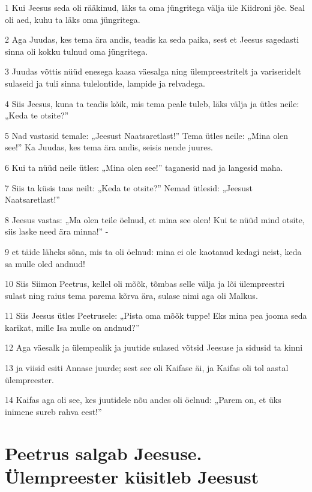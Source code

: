 \par 1 Kui Jeesus seda oli rääkinud, läks ta oma jüngritega välja üle Kiidroni jõe. Seal oli aed, kuhu ta läks oma jüngritega.
\par 2 Aga Juudas, kes tema ära andis, teadis ka seda paika, sest et Jeesus sagedasti sinna oli kokku tulnud oma jüngritega.
\par 3 Juudas võttis nüüd enesega kaasa väesalga ning ülempreestritelt ja variseridelt sulaseid ja tuli sinna tulelontide, lampide ja relvadega.
\par 4 Siis Jeesus, kuna ta teadis kõik, mis tema peale tuleb, läks välja ja ütles neile: „Keda te otsite?”
\par 5 Nad vastasid temale: „Jeesust Naatsaretlast!” Tema ütles neile: „Mina olen see!” Ka Juudas, kes tema ära andis, seisis nende juures.
\par 6 Kui ta nüüd neile ütles: „Mina olen see!” taganesid nad ja langesid maha.
\par 7 Siis ta küsis taas neilt: „Keda te otsite?” Nemad ütlesid: „Jeesust Naatsaretlast!”
\par 8 Jeesus vastas: „Ma olen teile öelnud, et mina see olen! Kui te nüüd mind otsite, siis laske need ära minna!” -
\par 9 et täide läheks sõna, mis ta oli öelnud: mina ei ole kaotanud kedagi neist, keda sa mulle oled andnud!
\par 10 Siis Siimon Peetrus, kellel oli mõõk, tõmbas selle välja ja lõi ülempreestri sulast ning raius tema parema kõrva ära, sulase nimi aga oli Malkus.
\par 11 Siis Jeesus ütles Peetrusele: „Pista oma mõõk tuppe! Eks mina pea jooma seda karikat, mille Isa mulle on andnud?”
\par 12 Aga väesalk ja ülempealik ja juutide sulased võtsid Jeesuse ja sidusid ta kinni
\par 13 ja viisid esiti Annase juurde; sest see oli Kaifase äi, ja Kaifas oli tol aastal ülempreester.
\par 14 Kaifas aga oli see, kes juutidele nõu andes oli öelnud: „Parem on, et üks inimene sureb rahva eest!”

\section*{Peetrus salgab Jeesuse. Ülempreester küsitleb Jeesust}

